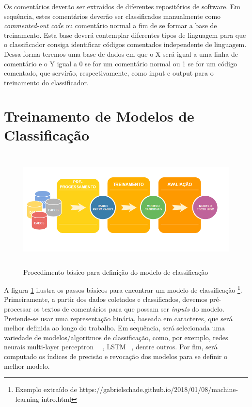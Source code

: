 \documentclass{abnt}
\begin{document}
Os comentários deverão ser extraídos de diferentes repositórios de software. 
Em sequência, estes comentários deverão ser classificados manualmente
como \textit{commented-out code} ou comentário normal a fim de se formar 
a base de treinamento. Esta base deverá contemplar diferentes tipos
de linguagem para que o classificador consiga identificar códigos
comentados independente de linguagem. Dessa forma teremos uma base de dados em que o 
X será igual a uma linha de comentário e o Y igual a 0 se for um comentário 
normal ou 1 se for um código comentado, que servirão, respectivamente, como input 
e output para o treinamento do classificador.

\section{Treinamento de Modelos de Classificação}

\begin{figure}[h!]
  \centering
  \includegraphics[height=2.4in,width=6.3in]{images/processing.png}
  \caption{ Procedimento básico para definição do modelo de classificação}
  
  \label{fig:fluxo}
\end{figure}

A figura \ref{fig:fluxo}  ilustra os passos básicos para encontrar um modelo de classificação
\footnote{Exemplo extraído de https://gabrielschade.github.io/2018/01/08/machine-learning-intro.html}.
Primeiramente, a partir dos dados coletados e classificados, devemos pré-processar
os textos de comentários para que possam ser \textit{inputs} do modelo.
Pretende-se usar uma representação binária, baseada em caracteres, que será
melhor definida ao longo do trabalho.
Em sequência, será selecionada uma variedade de modelos/algoritmos de classificação,
como, por exemplo, redes neurais multi-layer perceptron~\cite{zurada1992introduction}
~\cite{patternClassification}, LSTM~\cite{gers1999learning} , dentre outros. 
Por fim, será computado os índices de precisão e revocação dos modelos para se definir
o melhor modelo.
\end{document}
